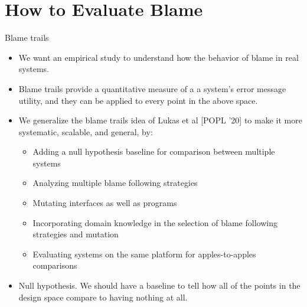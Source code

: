 \section{How to Evaluate Blame}


     \item Blame trails
       \begin{itemize}
       
        \item We want an empirical study to understand how the behavior of blame
        in real systems.

       
        \item Blame trails provide a quantitative measure of a a system's
        error message utility, and they can be applied to every point
        in the above space.

       \item We generalize the blame trails idea of Lukas et al [POPL '20] to make it
        more systematic, scalable, and general, by:
           \begin{itemize}
             \item Adding a null hypothesis baseline for comparison between multiple systems
             \item Analyzing multiple blame following strategies
             \item Mutating interfaces as well as programs
             \item Incorporating domain knowledge in the selection of blame following
           strategies and mutation
             \item Evaluating systems on the same platform for apples-to-apples comparisons
           \end{itemize}   

         \item Null hypothesis. We should have a baseline to tell how all of the points in the
        design space compare to having nothing at all.
\end{itemize}
